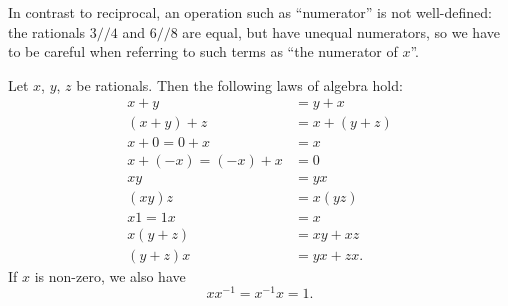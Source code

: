 \begin{note}
In contrast to reciprocal, an operation such as ``numerator'' is not well-defined:
the rationals \(3 // 4\) and \(6 // 8\) are equal, but have unequal numerators, so we have to be careful when referring to such terms as ``the numerator of \(x\)''.
\end{note}

\begin{proposition}\label{4.2.4}
Let \(x\), \(y\), \(z\) be rationals.
Then the following laws of algebra hold:
\begin{align*}
x + y &= y + x \\
(x + y) + z &= x + (y + z) \\
x + 0 = 0 + x &= x \\
x + (-x) = (-x) + x &= 0 \\
xy &= yx \\
(xy)z &= x(yz) \\
x1 = 1x &= x \\
x(y + z) &= xy + xz \\
(y + z)x &= yx + zx.
\end{align*}
If \(x\) is non-zero, we also have
\[
    xx^{-1} = x^{-1}x = 1.
\]
\end{proposition}

